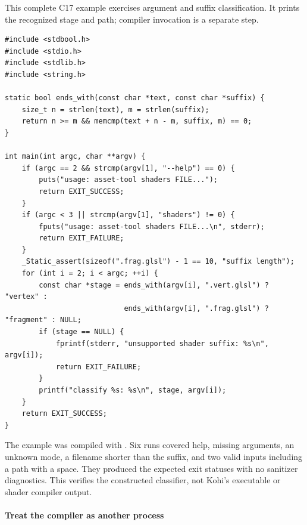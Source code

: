 This complete C17 example exercises argument and suffix classification. It prints the recognized stage and path; compiler invocation is a separate step.

\begin{verbatim}
#include <stdbool.h>
#include <stdio.h>
#include <stdlib.h>
#include <string.h>

static bool ends_with(const char *text, const char *suffix) {
    size_t n = strlen(text), m = strlen(suffix);
    return n >= m && memcmp(text + n - m, suffix, m) == 0;
}

int main(int argc, char **argv) {
    if (argc == 2 && strcmp(argv[1], "--help") == 0) {
        puts("usage: asset-tool shaders FILE...");
        return EXIT_SUCCESS;
    }
    if (argc < 3 || strcmp(argv[1], "shaders") != 0) {
        fputs("usage: asset-tool shaders FILE...\n", stderr);
        return EXIT_FAILURE;
    }
    _Static_assert(sizeof(".frag.glsl") - 1 == 10, "suffix length");
    for (int i = 2; i < argc; ++i) {
        const char *stage = ends_with(argv[i], ".vert.glsl") ? "vertex" :
                            ends_with(argv[i], ".frag.glsl") ? "fragment" : NULL;
        if (stage == NULL) {
            fprintf(stderr, "unsupported shader suffix: %s\n", argv[i]);
            return EXIT_FAILURE;
        }
        printf("classify %s: %s\n", stage, argv[i]);
    }
    return EXIT_SUCCESS;
}
\end{verbatim}

The example was compiled with . Six runs covered help, missing arguments, an unknown mode, a filename shorter than the suffix, and two valid inputs including a path with a space. They produced the expected exit statuses with no sanitizer diagnostics. This verifies the constructed classifier, not Kohi's executable or shader compiler output.

\paragraph{Treat the compiler as another process}\label{05-engine-i-ch013-treat-the-compiler-as-another-process}

\hypertarget{05-engine-i-ch013-treat-the-compiler-as-another-process}{}

